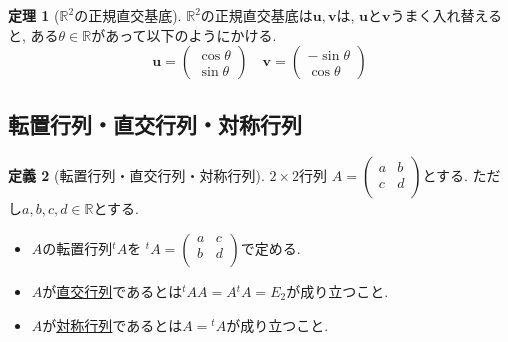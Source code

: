 \documentclass[dvipdfmx,a4paper,11pt]{article}
\newcommand{\R}{\mathbb{R}}
\theoremstyle{definition}
\newtheorem{thm}{定理}
\newtheorem{dfn}[thm]{定義}
\begin{document}
 
 
 \begin{tcolorbox}[
    colback = white,
    colframe = green!35!black,
    fonttitle = \bfseries,
    breakable = true]
    \begin{thm}[$\R^2$の正規直交基底]
$\R^2$の正規直交基底は$\bm{u},  \bm{v}$は, $\bm{u}$と$\bm{v}$うまく入れ替えると, ある$\theta \in \R$があって以下のようにかける. 
$$
\bm{u}
=
  \begin{pmatrix}
\cos \theta \\ \sin \theta
 \end{pmatrix}  
\quad
\bm{v}
=
\begin{pmatrix}
 -\sin \theta \\ \cos \theta
 \end{pmatrix}  
$$
\end{thm}
 \end{tcolorbox}
 
 \subsection{転置行列・直交行列・対称行列}
 
 \begin{tcolorbox}[
    colback = white,
    colframe = green!35!black,
    fonttitle = \bfseries,
    breakable = true]
    \begin{dfn}[転置行列・直交行列・対称行列]
$2 \times 2$行列
$
A=\begin{pmatrix}
a& b \\
c& d \\
\end{pmatrix}
$とする. ただし$a,b,c,d \in \R$とする.
\begin{itemize}
\setlength{\parskip}{0cm}
 \setlength{\itemsep}{0pt} 
\item $A$の転置行列${}^t A$を
${}^t A =\begin{pmatrix}
a& c \\
b& d \\
\end{pmatrix}
$で定める.
\item $A$が\underline{直交行列}であるとは${}^t A A= A {}^t A = E_2$が成り立つこと.
\item $A$が\underline{対称行列}であるとは$ A= {}^t A$が成り立つこと.
\end{itemize}
\end{dfn}
 \end{tcolorbox}
 
\end{document}
